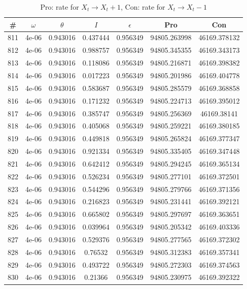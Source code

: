\newpage
\begin{table}
\caption{Pro: rate for $X_t \rightarrow X_t + 1$, Con: rate for $X_t \rightarrow X_t - 1$}
\begin{tabular*}{\linewidth}{c|c|c|c|c|c|c}
\# & $\omega$ & $\theta$ & $I$ & $\epsilon$ & Pro & Con \\
\hline
811 & 4e-06 & 0.943016 & 0.437444 & 0.956349 & 94805.263998 & 46169.378132\\
812 & 4e-06 & 0.943016 & 0.988757 & 0.956349 & 94805.345355 & 46169.343173\\
813 & 4e-06 & 0.943016 & 0.118086 & 0.956349 & 94805.216871 & 46169.398382\\
814 & 4e-06 & 0.943016 & 0.017223 & 0.956349 & 94805.201986 & 46169.404778\\
815 & 4e-06 & 0.943016 & 0.583687 & 0.956349 & 94805.285579 & 46169.368858\\
816 & 4e-06 & 0.943016 & 0.171232 & 0.956349 & 94805.224713 & 46169.395012\\
817 & 4e-06 & 0.943016 & 0.385747 & 0.956349 & 94805.256369 & 46169.38141\\
818 & 4e-06 & 0.943016 & 0.405068 & 0.956349 & 94805.259221 & 46169.380185\\
819 & 4e-06 & 0.943016 & 0.449818 & 0.956349 & 94805.265824 & 46169.377347\\
820 & 4e-06 & 0.943016 & 0.921334 & 0.956349 & 94805.335405 & 46169.347448\\
821 & 4e-06 & 0.943016 & 0.642412 & 0.956349 & 94805.294245 & 46169.365134\\
822 & 4e-06 & 0.943016 & 0.526234 & 0.956349 & 94805.277101 & 46169.372501\\
823 & 4e-06 & 0.943016 & 0.544296 & 0.956349 & 94805.279766 & 46169.371356\\
824 & 4e-06 & 0.943016 & 0.216823 & 0.956349 & 94805.231441 & 46169.392121\\
825 & 4e-06 & 0.943016 & 0.665802 & 0.956349 & 94805.297697 & 46169.363651\\
826 & 4e-06 & 0.943016 & 0.039964 & 0.956349 & 94805.205342 & 46169.403336\\
827 & 4e-06 & 0.943016 & 0.529376 & 0.956349 & 94805.277565 & 46169.372302\\
828 & 4e-06 & 0.943016 & 0.76532 & 0.956349 & 94805.312383 & 46169.357341\\
829 & 4e-06 & 0.943016 & 0.493722 & 0.956349 & 94805.272303 & 46169.374563\\
830 & 4e-06 & 0.943016 & 0.21366 & 0.956349 & 94805.230975 & 46169.392322\\

\end{tabular*}
\end{table}
